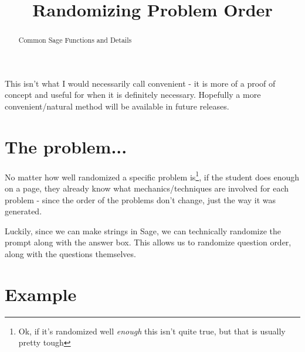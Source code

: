 \documentclass{ximera}
\title{Randomizing Problem Order}
\begin{document}
\begin{abstract}
     Common Sage Functions and Details
\end{abstract}
\maketitle

This isn't what I would necessarily call convenient - it is more of a proof of concept and useful for when it is definitely necessary. Hopefully a more convenient/natural method will be available in future releases.

\section{The problem...}

    No matter how well randomized a specific problem is\footnote{Ok, if it's randomized well \textit{enough} this isn't quite true, but that is usually pretty tough}, if the student does enough on a page, they already know what mechanics/techniques are involved for each problem - since the order of the problems don't change, just the way it was generated.
    
    Luckily, since we can make strings in Sage, we can technically randomize the prompt along with the answer box. This allows us to randomize question order, along with the questions themselves. 


\section{Example}
\end{document}
